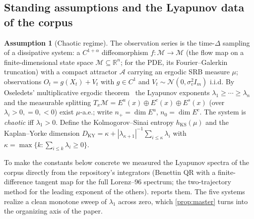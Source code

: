 \documentclass[10pt]{article}
\theoremstyle{plain}
\theoremstyle{definition}
\newtheorem{assumption}{Assumption}
\theoremstyle{remark}
\newcommand{\R}{\mathbb{R}}
\newcommand{\attr}{\mathcal{A}}
\newcommand{\Msp}{\mathcal{M}}
\newcommand{\srb}{\mu}
\newcommand{\hKS}{h_{\mathrm{KS}}}
\newcommand{\DKY}{D_{\mathrm{KY}}}
\newcommand{\Eu}{E^{u}}
\newcommand{\Ec}{E^{c}}
\newcommand{\Es}{E^{s}}
\begin{document}
\subsection{Standing assumptions and the Lyapunov data of the corpus}

\begin{assumption}[Chaotic regime]\label{ass:chaos}
The observation series is the time-$\Delta$ sampling of a dissipative system: a
$C^{1+\alpha}$ diffeomorphism $f:\Msp\to\Msp$ (the flow map on a
finite-dimensional state space $\Msp\subseteq\R^n$; for the PDE, its
Fourier--Galerkin truncation) with a compact attractor $\attr$ carrying an
ergodic SRB measure $\srb$; observations $O_t=g(X_t)+V_t$ with $g\in C^1$ and
$V_t\sim\mathcal N(0,\sigma_v^2 I_m)$ i.i.d. By Oseledets' multiplicative ergodic
theorem~\cite{oseledets1968} the Lyapunov exponents
$\lambda_1\ge\cdots\ge\lambda_n$ and the measurable splitting $T_x\Msp=
\Eu(x)\oplus\Ec(x)\oplus\Es(x)$ (over $\lambda_i>0,=0,<0$) exist $\srb$-a.e.;
write $n_+=\dim\Eu$, $n_0=\dim\Ec$. The system is \emph{chaotic} iff
$\lambda_1>0$. Define the Kolmogorov--Sinai entropy $\hKS(\srb)$ and the
Kaplan--Yorke dimension $\DKY=\kappa+|\lambda_{\kappa+1}|^{-1}\sum_{i\le\kappa}
\lambda_i$ with $\kappa=\max\{k:\sum_{i\le k}\lambda_i\ge0\}$.
\end{assumption}

To make the constants below concrete we measured the Lyapunov spectra of the
corpus directly from the repository's integrators (Benettin QR with a
finite-difference tangent map for the full Lorenz--96 spectrum; the two-trajectory
method for the leading exponent of the others).  reports them.
The five systems realize a clean monotone sweep of $\lambda_1$ across zero, which
\cref{prop:master} turns into the organizing axis of the paper.
\end{document}
